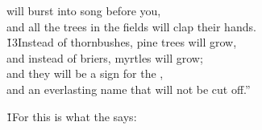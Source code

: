 \begin{poetry}
\poemll    will burst into song before you, \\
\poemlll       and all the trees in the fields will clap their hands. \\
\poeml \v{13}Instead of thornbushes, pine trees will grow, \\
\poemll    and instead of briers, myrtles will grow; \\
\poeml and they will be a sign for the , \\
\poemll    and an everlasting name that will not be cut off.''
\end{poetry}

\v{1}For this is what the  says:

